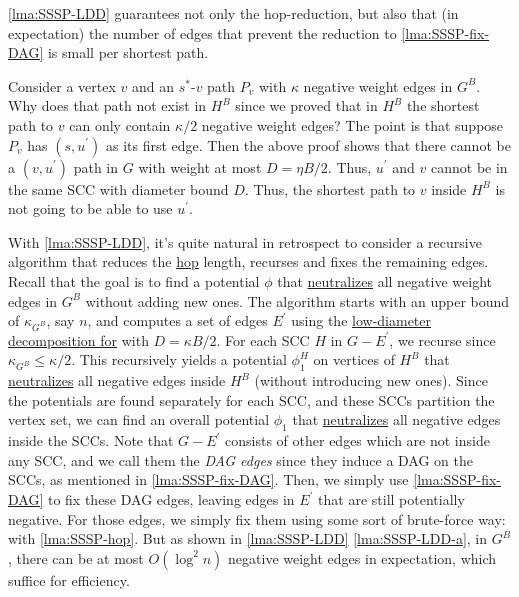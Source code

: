 \begin{intuition}
	\autoref{lma:SSSP-LDD} guarantees not only the hop-reduction, but also that (in expectation) the number of edges that prevent the reduction to \autoref{lma:SSSP-fix-DAG} is small per shortest path.
\end{intuition}

\begin{remark}
	Consider a vertex \(v\) and an \(s^{\ast} \)-\(v\) path \(P_v\) with \(\kappa \) negative weight edges in \(G^B\). Why does that path not exist in \(H^B\) since we proved that in \(H^B\) the shortest path to \(v\) can only contain \(\kappa / 2\) negative weight edges? The point is that suppose \(P_v\) has \((s, u^{\prime} )\) as its first edge. Then the above proof shows that there cannot be a \((v, u^{\prime} )\) path in \(G\) with weight at most \(D = \eta B / 2\). Thus, \(u^{\prime} \) and \(v\) cannot be in the same SCC with diameter bound \(D\). Thus, the shortest path to \(v\) inside \(H^B\) is not going to be able to use \(u^{\prime} \).
\end{remark}

With \autoref{lma:SSSP-LDD}, it's quite natural in retrospect to consider a recursive algorithm that reduces the \hyperref[not:hop]{hop} length, recurses and fixes the remaining edges. Recall that the goal is to find a potential \(\phi \) that \hyperref[def:neutralize]{neutralizes} all negative weight edges in \(G^B\) without adding new ones. The algorithm starts with an upper bound of \(\kappa _{G^B}\), say \(n\), and computes a set of edges \(E^{\prime} \) using the \hyperref[thm:directed-LDD]{low-diameter decomposition for} with \(D = \kappa B / 2\). For each SCC \(H\) in \(G - E^{\prime} \), we recurse since \(\kappa _{G^B} \leq \kappa / 2\). This recursively yields a potential \(\phi ^H_1\) on vertices of \(H^B\) that \hyperref[def:neutralize]{neutralizes} all negative edges inside \(H^B\) (without introducing new ones). Since the potentials are found separately for each SCC, and these SCCs partition the vertex set, we can find an overall potential \(\phi _1\) that \hyperref[def:neutralize]{neutralizes} all negative edges inside the SCCs. Note that \(G - E^{\prime} \) consists of other edges which are not inside any SCC, and we call them the \emph{DAG edges} since they induce a DAG on the SCCs, as mentioned in \autoref{lma:SSSP-fix-DAG}. Then, we simply use \autoref{lma:SSSP-fix-DAG} to fix these DAG edges, leaving edges in \(E^{\prime} \) that are still potentially negative. For those edges, we simply fix them using some sort of brute-force way: with \autoref{lma:SSSP-hop}. But as shown in \autoref{lma:SSSP-LDD} \autoref{lma:SSSP-LDD-a}, in \(G^B\), there can be at most \(O(\log ^2 n)\) negative weight edges in expectation, which suffice for efficiency.

